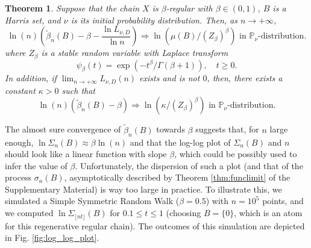 \documentclass[sn-mathphys-ay]{sn-jnl}%
\newtheorem{theorem}{Theorem}[section]%
\renewcommand{\P}{\mathbb{P}}
\begin{document}
\begin{theorem}\label{th:rate_convergence}Suppose that the chain $X$ is $\beta$-regular with $\beta\in (0,1)$, $B$ is a Harris set, and $\nu$ is its initial probability distribution. Then, as $n\to +\infty$,
    \begin{equation*}
        \ln(n)\left( \widetilde{\beta}_n(B)-\beta - {\frac{\ln{L_{\nu,D}}}{\ln{n}}} \right)\Rightarrow \ln{\left( \mu(B)/(Z_{\beta})^{\beta} \right)} \text{ in } \mathbb{P}_{\nu}\text{-distribution}.
    \end{equation*}
    where $Z_{\beta}$ is a stable random variable with Laplace transform
    \[\psi_{\beta}\left ( t \right )=\exp\left (-t^{\beta}/\Gamma( \beta+1) \right ),\quad t\geq 0.\]
    In addition, if $\lim_{n\to +\infty}L_{\nu,D}(n)$ exists and is not $0$, then, there
    exists a constant $\kappa>0$ such that
    \begin{equation*}
        \ln(n)\left( \widetilde{\beta}_n(B)-\beta \right)\Rightarrow \ln{\left( \kappa/(Z_{\beta})^{\beta} \right)} \text{ in } \P_{\nu}\text{-distribution}.
    \end{equation*}
\end{theorem}


The almost sure convergence of $\widetilde{\beta}_n(B)$ towards $\beta$ suggests that,
for $n$ large enough, $\ln\Sigma_n(B)\approx\beta\ln(n)$ and that the log-log plot of
$\Sigma_n(B)$ and $n$ should look like a linear function with slope $\beta$, which could
be possibly used to infer the value of $\beta$. Unfortunately, the dispersion of such a
plot (and that of the process $\sigma_n(B)$, asymptotically described by Theorem
\ref{thm:funclimit} of the Supplementary Material) is way too large in practice. To
illustrate this, we simulated a Simple Symmetric Random Walk ($\beta=0.5$) with $n=10^5$
points, and we computed $\ln\Sigma_{\lfloor {nt} \rfloor}(B)$ for $0.1\leq t\leq 1$
(choosing $B=\{0\}$, which is an atom for this regenerative regular chain). The outcomes
of this simulation are depicted in Fig. \ref{fig:log_log_plot}.
\end{document}
